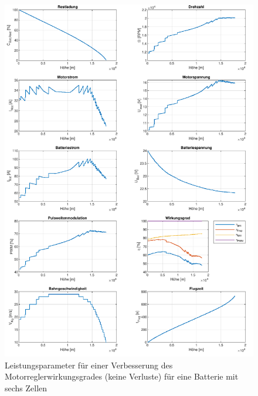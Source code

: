 \begin{appendix}
\begin{figure}[H]
\centering
	\includegraphics[scale=0.7]{Diagramme/Untersuchung_eta_pwm_1_6.pdf}
	\caption{Leistungsparameter für einer Verbesserung des Motorreglerwirkungsgrades (keine Verluste) für eine Batterie mit sechs Zellen}
	\label{abb:eta_pwm_6_1}
\end{figure}



\end{appendix}
